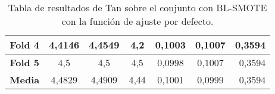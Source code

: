 \begin{table}[H]
{\begin{tabular}{|crrrrrr|}
\multicolumn{1}{|c|}{\textbf{Fold 4}} & \multicolumn{1}{c|}{4,4146}            & \multicolumn{1}{c|}{4,4549}              & \multicolumn{1}{c|}{\textbf{4,2}}  & \multicolumn{1}{c|}{0,1003}            & \multicolumn{1}{c|}{0,1007}              & 0,3594                             \\ \hline
\multicolumn{1}{|c|}{\textbf{Fold 5}} & \multicolumn{1}{c|}{4,5}               & \multicolumn{1}{c|}{4,5}                 & \multicolumn{1}{c|}{4,5}           & \multicolumn{1}{c|}{0,0998}            & \multicolumn{1}{c|}{0,1007}              & 0,3594                             \\ \hline
\multicolumn{1}{|c|}{\textbf{Media}}  & \multicolumn{1}{c|}{4,4829}           & \multicolumn{1}{c|}{4,4909}             & \multicolumn{1}{c|}{4,44}          & \multicolumn{1}{c|}{0,1001}            & \multicolumn{1}{c|}{0,0999}             & 0,3594                             \\ \hline
\end{tabular}%
}
\caption{Tabla de resultados de Tan sobre el conjunto con BL-SMOTE con la función de ajuste por defecto.}\label{tablaTANconBLSMOTEdefecto}

\end{table}

